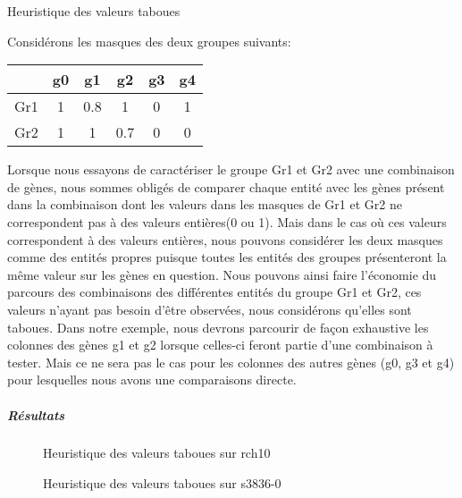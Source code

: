 \begin{exemple}{Heuristique des valeurs taboues}
{
	Considérons les masques des deux groupes suivants:\\
	\begin{center}
		\begin{tabular}{|c|c|c|c|c|c|}
		\hline 
		\backslashbox{Groupe}{Gènes} & g0 & g1 & g2 & g3 & g4 \\ 
		\hline 
		Gr1 & 1 & 0.8 & 1 & 0 & 1 \\ 
		\hline 
		Gr2 & 1 & 1 & 0.7 & 0 & 0 \\  
		\hline 
		\end{tabular}
	\end{center}
	
Lorsque nous essayons de caractériser le groupe Gr1 et Gr2 avec une combinaison de gènes, nous sommes obligés de comparer chaque entité avec les gènes présent dans la combinaison dont les valeurs dans les masques de Gr1 et Gr2 ne correspondent pas à des valeurs entières(0 ou 1). Mais dans le cas où ces valeurs correspondent à des valeurs entières, nous pouvons considérer les deux masques comme des entités propres puisque toutes les entités des groupes présenteront la même valeur sur les gènes en question. Nous pouvons ainsi faire l'économie du parcours des combinaisons des différentes entités du groupe Gr1 et Gr2, ces valeurs n'ayant pas besoin d'être observées, nous considérons qu'elles sont taboues. Dans notre exemple, nous devrons parcourir de façon exhaustive les colonnes des gènes g1 et g2 lorsque celles-ci feront partie d'une combinaison à tester. Mais ce ne sera pas le cas pour les colonnes des autres gènes (g0, g3 et g4) pour lesquelles nous avons une comparaisons directe.
}
\end{exemple}



\subparagraph{Résultats}

\begin{figure}
\centering
	\begin{minipage}[c]{0.49\linewidth}
	\centering
	
	\end{minipage}
	\begin{minipage}[c]{0.49\linewidth}
	\centering
	
	\end{minipage}
\caption{Heuristique des valeurs taboues sur rch10}
\label{tabourch10}
\end{figure}

\begin{figure}
\centering
	\begin{minipage}[c]{0.49\linewidth}
	\centering
	
	\end{minipage}
	\begin{minipage}[c]{0.49\linewidth}
	\centering
	
	\end{minipage}
\caption{Heuristique des valeurs taboues sur s3836-0}
\label{tabou3836}
\end{figure}

